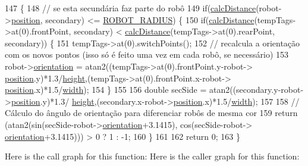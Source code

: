 \begin{DoxyCode}
147                                                                                         \{
148     \textcolor{comment}{// se esta secundária faz parte do robô}
149     \textcolor{keywordflow}{if}(\hyperlink{class_vision_a4f6f281bd1aaacad29c9e48f4d8fb1b9}{calcDistance}(robot->\hyperlink{struct_robots_1_1___status_a9ae95d6ec38055984ee4eaac82138373}{position}, secondary) <= 
      \hyperlink{camcap_8hpp_ab69dd643c61be536f4dc344cf7da0be6}{ROBOT\_RADIUS}) \{
150         \textcolor{keywordflow}{if}(\hyperlink{class_vision_a4f6f281bd1aaacad29c9e48f4d8fb1b9}{calcDistance}(tempTags->at(0).frontPoint, secondary) < 
      \hyperlink{class_vision_a4f6f281bd1aaacad29c9e48f4d8fb1b9}{calcDistance}(tempTags->at(0).rearPoint, secondary)) \{
151             tempTags->at(0).switchPoints();
152             \textcolor{comment}{// recalcula a orientação com os novos pontos (isso só é feito uma vez em cada robô, se
       necessário)}
153             robot->\hyperlink{struct_robots_1_1___status_ae7a5a28b09e25cf94607fc00b57f7c7e}{orientation} = atan2((tempTags->at(0).frontPoint.y-robot->
      \hyperlink{struct_robots_1_1___status_a9ae95d6ec38055984ee4eaac82138373}{position}.y)*1.3/\hyperlink{class_vision_aa6f52191ab439505b6156835594f1861}{height},(tempTags->at(0).frontPoint.x-robot->
      \hyperlink{struct_robots_1_1___status_a9ae95d6ec38055984ee4eaac82138373}{position}.x)*1.5/\hyperlink{class_vision_ac82a1da77a8b08d112e5c4688bd70c3d}{width});
154         \}
155 
156         \textcolor{keywordtype}{double} secSide = atan2((secondary.y-robot->\hyperlink{struct_robots_1_1___status_a9ae95d6ec38055984ee4eaac82138373}{position}.y)*1.3/
      \hyperlink{class_vision_aa6f52191ab439505b6156835594f1861}{height},(secondary.x-robot->\hyperlink{struct_robots_1_1___status_a9ae95d6ec38055984ee4eaac82138373}{position}.x)*1.5/\hyperlink{class_vision_ac82a1da77a8b08d112e5c4688bd70c3d}{width});
157 
158         \textcolor{comment}{// Cálculo do ângulo de orientação para diferenciar robôs de mesma cor}
159         \textcolor{keywordflow}{return} (atan2(sin(secSide-robot->\hyperlink{struct_robots_1_1___status_ae7a5a28b09e25cf94607fc00b57f7c7e}{orientation}+3.1415), cos(secSide-robot->
      \hyperlink{struct_robots_1_1___status_ae7a5a28b09e25cf94607fc00b57f7c7e}{orientation}+3.1415))) > 0 ? 1 : -1;
160     \}
161 
162     \textcolor{keywordflow}{return} 0;
163 \}
\end{DoxyCode}
Here is the call graph for this function\+:
Here is the caller graph for this function\+:
\mbox{\label{class_vision_a7990c9cb8684e1d1c92a5b6aa99abe6f}} 
